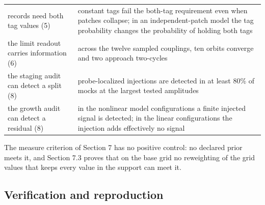 \begin{longtable}[]{@{}ll@{}}
\begin{minipage}[t]{0.47\columnwidth}
records need both tag values (5)\strut
\end{minipage} & \begin{minipage}[t]{0.47\columnwidth}\raggedright
constant tags fail the both-tag requirement even when patches collapse;
in an independent-patch model the tag probability changes the
probability of holding both tags\strut
\end{minipage}\tabularnewline
\begin{minipage}[t]{0.47\columnwidth}\raggedright
the limit readout carries information (6)\strut
\end{minipage} & \begin{minipage}[t]{0.47\columnwidth}\raggedright
across the twelve sampled couplings, ten orbits converge and two
approach two-cycles\strut
\end{minipage}\tabularnewline
\begin{minipage}[t]{0.47\columnwidth}\raggedright
the staging audit can detect a split (8)\strut
\end{minipage} & \begin{minipage}[t]{0.47\columnwidth}\raggedright
probe-localized injections are detected in at least 80\% of mocks at the
largest tested amplitudes\strut
\end{minipage}\tabularnewline
\begin{minipage}[t]{0.47\columnwidth}\raggedright
the growth audit can detect a residual (8)\strut
\end{minipage} & \begin{minipage}[t]{0.47\columnwidth}\raggedright
in the nonlinear model configurations a finite injected signal is
detected; in the linear configurations the injection adds effectively no
signal\strut
\end{minipage}\tabularnewline
\bottomrule
\end{longtable}
\addtocounter{table}{-1}

The measure criterion of Section 7 has no positive control: no declared
prior meets it, and Section 7.3 proves that on the base grid no
reweighting of the grid values that keeps every value in the support can
meet it.

\hypertarget{verification-and-reproduction}{%
\subsection{Verification and
reproduction}\label{verification-and-reproduction}}

